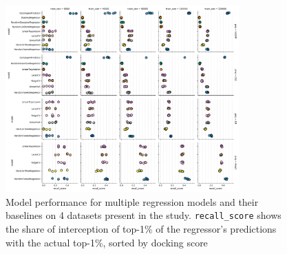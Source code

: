 



\begin{figure}[h]
\centering
\includegraphics[width=0.8\textwidth]{figures/Figure_3_single-shot-performance.png}
\caption{Model performance for multiple regression models and their baselines on 4 datasets present in the study. \texttt{recall\_score} shows the share of interception of top-1\% of the regressor's predictions with the actual top-1\%, sorted by docking score}
\label{fig:fig_3}
\end{figure}


